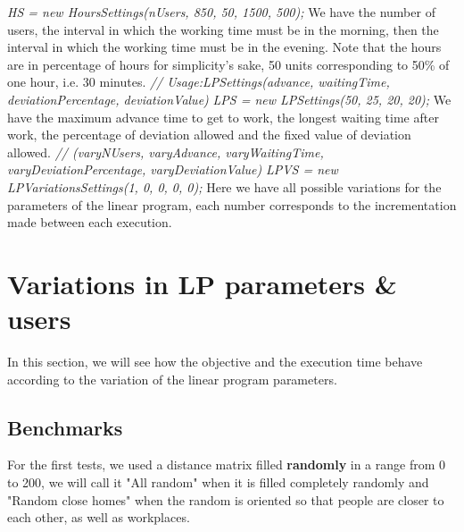 \documentclass[12pt, a4paper, twoside]{memoir}
\newcommand{\newpar}{\vskip 0.2in \noindent}
\newcommand\tab[1][1cm]{\hspace*{#1}}
\begin{document}
{	\tab \textit{HS = new HoursSettings(nUsers, 850, 50, 1500, 500);}\newline
	We have the number of users, the interval in which the working time must be in the morning, then the interval in which the working time must be in the evening. Note that the hours are in percentage of hours for simplicity's sake, 50 units corresponding to 50\% of one hour, i.e. 30 minutes.
	\newpar
	\tab \textit{// Usage:LPSettings(advance, waitingTime, deviationPercentage, deviationValue)}\newline
	\tab \textit{LPS = new LPSettings(50, 25, 20, 20);}\newline
	We have the maximum advance time to get to work, the longest waiting time after work, the percentage of deviation allowed and the fixed value of deviation allowed.
	\newpar
	\tab \textit{// (varyNUsers, varyAdvance, varyWaitingTime, varyDeviationPercentage, varyDeviationValue)}\newline
	\tab \textit{LPVS = new LPVariationsSettings(1, 0, 0, 0, 0);}\newline
	Here we have all possible variations for the parameters of the linear program, each number corresponds to the incrementation made between each execution.
	
	\section{Variations in LP parameters \& users}
	
	In this section, we will see how the objective and the execution time behave according to the variation of the linear program parameters.
	
	\subsection{Benchmarks}
	For the first tests, we used a distance matrix filled \textbf{randomly} in a range from 0 to 200, we will call it "All random" when it is filled completely randomly and "Random close homes" when the random is oriented so that people are closer to each other, as well as workplaces.
	
}
\end{document}
